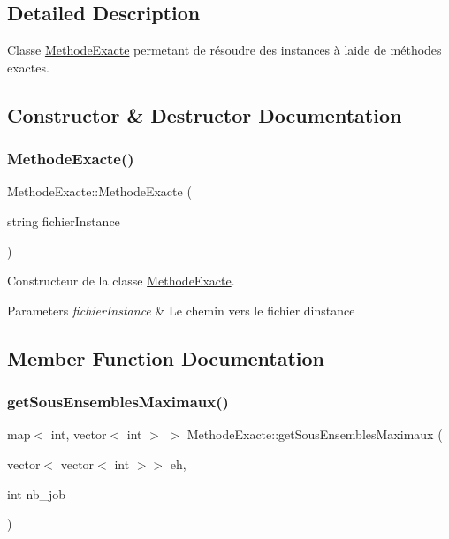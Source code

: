 \subsection{Detailed Description}
Classe \hyperlink{classMethodeExacte}{Methode\+Exacte} permetant de résoudre des instances à l\textquotesingle{}aide de méthodes exactes. 

\subsection{Constructor \& Destructor Documentation}
\mbox{\label{classMethodeExacte_a1548457daee37a44a3913378d90dab65}} 
\subsubsection{\texorpdfstring{Methode\+Exacte()}{MethodeExacte()}}
{\footnotesize\ttfamily Methode\+Exacte\+::\+Methode\+Exacte (\begin{DoxyParamCaption}\item[{string}]{fichier\+Instance }\end{DoxyParamCaption})}



Constructeur de la classe \hyperlink{classMethodeExacte}{Methode\+Exacte}. 


\begin{DoxyParams}{Parameters}
{\em fichier\+Instance} & Le chemin vers le fichier d\textquotesingle{}instance \\
\hline
\end{DoxyParams}


\subsection{Member Function Documentation}
\mbox{\label{classMethodeExacte_a10f398a3e3c163f7fc9b45f48f916f98}} 
\subsubsection{\texorpdfstring{get\+Sous\+Ensembles\+Maximaux()}{getSousEnsemblesMaximaux()}}
{\footnotesize\ttfamily map$<$ int, vector$<$ int $>$ $>$ Methode\+Exacte\+::get\+Sous\+Ensembles\+Maximaux (\begin{DoxyParamCaption}\item[{vector$<$ vector$<$ int $>$$>$}]{eh,  }\item[{int}]{nb\+\_\+job }\end{DoxyParamCaption})}



